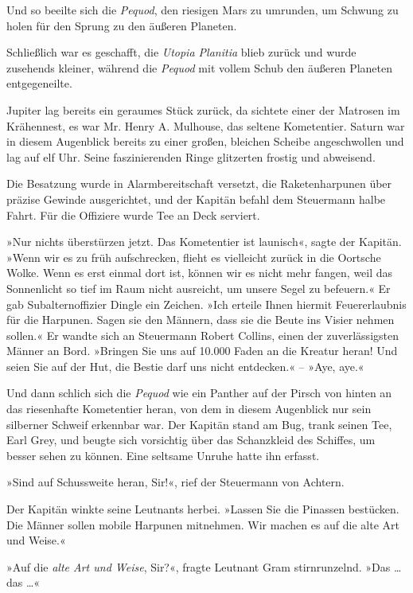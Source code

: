 Und so beeilte sich die \textit{Pequod}, den riesigen Mars zu umrunden, um
Schwung zu holen für den Sprung zu den äußeren Planeten.

Schließlich war es geschafft, die \textit{Utopia Planitia} blieb zurück und
wurde zusehends kleiner, während die \textit{Pequod} mit vollem Schub den
äußeren Planeten entgegeneilte.

Jupiter lag bereits ein geraumes Stück zurück, da sichtete einer
der Matrosen im Krähennest, es war Mr. Henry A. Mulhouse, das
seltene Kometentier. Saturn war in diesem Augenblick bereits zu
einer großen, bleichen Scheibe angeschwollen und lag auf elf Uhr.
Seine faszinierenden Ringe glitzerten frostig und abweisend.

Die Besatzung wurde in Alarmbereitschaft versetzt, die
Raketenharpunen über präzise Gewinde ausgerichtet, und der Kapitän
befahl dem Steuermann halbe Fahrt. Für die Offiziere wurde Tee an
Deck serviert.

»Nur nichts überstürzen jetzt. Das Kometentier ist launisch«, sagte
der Kapitän. »Wenn wir es zu früh aufschrecken, flieht es
vielleicht zurück in die Oortsche Wolke. Wenn es erst einmal dort
ist, können wir es nicht mehr fangen, weil das Sonnenlicht so tief
im Raum nicht ausreicht, um unsere Segel zu befeuern.« Er gab
Subalternoffizier Dingle ein Zeichen. »Ich erteile Ihnen hiermit
Feuererlaubnis für die Harpunen. Sagen sie den Männern, dass sie
die Beute ins Visier nehmen sollen.« Er wandte sich an Steuermann
Robert Collins, einen der zuverlässigsten Männer an Bord. »Bringen
Sie uns auf 10.000 Faden an die Kreatur heran! Und seien Sie auf
der Hut, die Bestie darf uns nicht entdecken.« – »Aye, aye.«

Und dann schlich sich die \textit{Pequod} wie ein Panther auf der Pirsch von
hinten an das riesenhafte Kometentier heran, von dem in diesem
Augenblick nur sein silberner Schweif erkennbar war. Der Kapitän
stand am Bug, trank seinen Tee, Earl Grey, und beugte sich
vorsichtig über das Schanzkleid des Schiffes, um besser sehen zu
können. Eine seltsame Unruhe hatte ihn erfasst.

»Sind auf Schussweite heran, Sir!«, rief der Steuermann von
Achtern.

Der Kapitän winkte seine Leutnants herbei. »Lassen Sie die Pinassen
bestücken. Die Männer sollen mobile Harpunen mitnehmen. Wir machen
es auf die alte Art und Weise.«

»Auf die \emph{alte Art und Weise}, Sir?«, fragte Leutnant Gram
stirnrunzelnd. »Das \ldots{} das \ldots{}«

